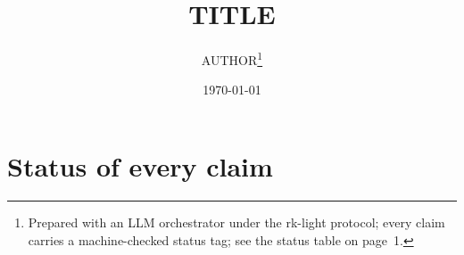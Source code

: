 \documentclass[11pt,a4paper]{article}
\title{TITLE}
\author{AUTHOR\thanks{Prepared with an LLM orchestrator under the rk-light protocol; every claim carries a machine-checked status tag; see the status table on page~1.}}
\date{\today}
\theoremstyle{definition}
\theoremstyle{remark}
\begin{document}
\maketitle

\section*{Status of every claim}\label{sec:status}

\tableofcontents






\end{document}
